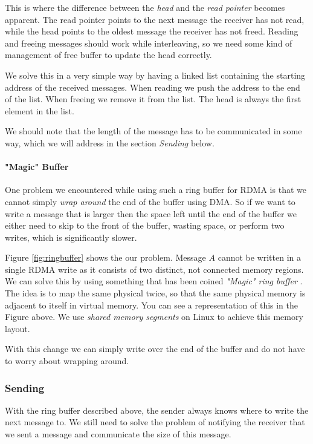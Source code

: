 This is where the difference between the \emph{head} and the \emph{read pointer} becomes apparent. The read pointer points 
to the next message the receiver has not read, while the head points to the oldest message the receiver has not freed. Reading
and freeing messages should work while interleaving, so we need some kind of management of free buffer to update the head 
correctly.

We solve this in a very simple way by having a linked list containing the starting address of the received messages. When
reading we push the address to the end of the list. When freeing we remove it from the list. The head is always the first 
element in the list.

We should note that the length of the message has to be communicated in some way, which we will address in the section 
\emph{Sending} below.





\paragraph{"Magic" Buffer} One problem we encountered while using such a ring buffer for RDMA is that we cannot simply 
\emph{wrap around} the end of the buffer using DMA. So if we want to write a message that is larger then the space left until
the end of the buffer we either need to skip to the front of the buffer, wasting space, or perform two writes, which is 
significantly slower.

Figure \ref{fig:ringbuffer} shows the our problem. Message $A$ cannot be written in a single RDMA write as it consists of 
two distinct, not connected memory regions. We can solve this by using something that has been coined 
\emph{"Magic" ring buffer} . The idea is to map the same physical twice,
so that the same physical memory is adjacent to itself in virtual memory. You can see a representation of this in the 
Figure above. We use \emph{shared memory segments} on Linux to achieve this memory layout.

With this change we can simply write over the end of the buffer and do not have to worry about wrapping around.

\subsubsection{Sending}
With the ring buffer described above, the sender always knows where to write the next message to. We still need to solve
the problem of notifying the receiver that we sent a message and communicate the size of this message.

